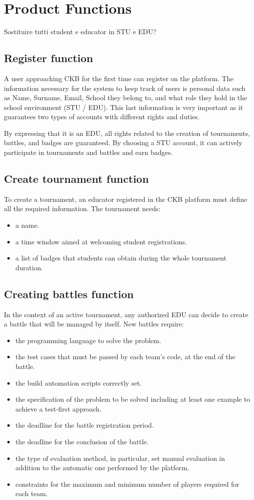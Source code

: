\section{Product Functions}
{\color{red} Sostituire tutti student e educator in STU e EDU?}
\subsection{Register function}
A user approaching CKB for the first time can register on the platform.
The information necessary for the system to keep track of users is personal data such as Name, Surname, Email, School they belong to, and what role they hold in the school environment (STU / EDU).
This last information is very important as it guarantees two types of accounts with different rights and duties.

By expressing that it is an EDU, all rights related to the creation of tournaments, battles, and badges are guaranteed.
By choosing a STU account, it can actively participate in tournaments and battles and earn badges.

\subsection{Create tournament function}
To create a tournament, an educator registered in the CKB platform must define all the required information.
The tournament needs:
\begin{itemize}
    \item a name.
    \item a time window aimed at welcoming student registrations.
    \item a list of badges that students can obtain during the whole tournament duration.
\end{itemize}

\subsection{Creating battles function}
In the context of an active tournament, any authorized EDU can decide to create a battle that will be managed by itself.
New battles require:
\begin{itemize}
    \item the programming language to solve the problem.
    \item the test cases that must be passed by each team's code, at the end of the battle. 
    \item the build automation scripts correctly set.
    \item the specification of the problem to be solved including at least one example to achieve a test-first approach.
    \item the deadline for the battle registration period.
    \item the deadline for the conclusion of the battle.
    \item the type of evaluation method, in particular, set manual evaluation in addition to the automatic one performed by the platform.
    \item constraints for the maximum and minimum number of players required for each team.
\end{itemize}

